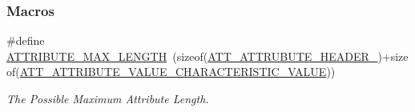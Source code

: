 \subsubsection*{Macros}
\begin{DoxyCompactItemize}
\item 
\#define \hyperlink{group___b_l_e___g_a_t_t___s_e_r_v_i_c_e___t_a_b_l_e_gadd59d59b4b6fde417c34e5d89b4f7f49}{A\+T\+T\+R\+I\+B\+U\+T\+E\+\_\+\+M\+A\+X\+\_\+\+L\+E\+N\+G\+TH}~(sizeof(\hyperlink{struct_a_t_t___a_t_t_r_u_b_u_t_e___h_e_a_d_e_r__16}{A\+T\+T\+\_\+\+A\+T\+T\+R\+U\+B\+U\+T\+E\+\_\+\+H\+E\+A\+D\+E\+R\+\_})+sizeof(\hyperlink{struct_a_t_t___a_t_t_r_i_b_u_t_e___v_a_l_u_e___c_h_a_r_a_c_t_e_r_i_s_t_i_c___v_a_l_u_e}{A\+T\+T\+\_\+\+A\+T\+T\+R\+I\+B\+U\+T\+E\+\_\+\+V\+A\+L\+U\+E\+\_\+\+C\+H\+A\+R\+A\+C\+T\+E\+R\+I\+S\+T\+I\+C\+\_\+\+V\+A\+L\+UE}))\hypertarget{group___b_l_e___g_a_t_t___s_e_r_v_i_c_e___t_a_b_l_e_gadd59d59b4b6fde417c34e5d89b4f7f49}{}\label{group___b_l_e___g_a_t_t___s_e_r_v_i_c_e___t_a_b_l_e_gadd59d59b4b6fde417c34e5d89b4f7f49}

\begin{DoxyCompactList}\small\item\em The Possible Maximum Attribute Length. \end{DoxyCompactList}\end{DoxyCompactItemize}
